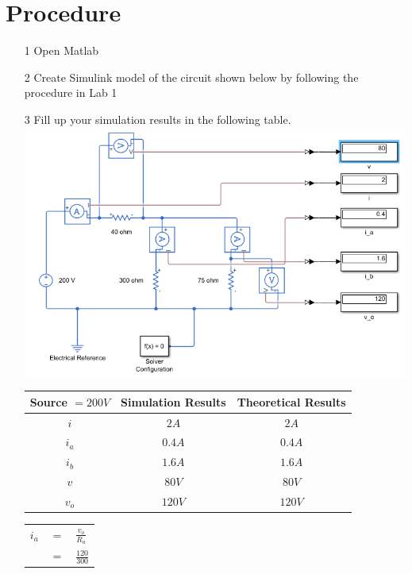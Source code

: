 \documentclass[a4paper]{article}
\begin{document}
\section*{Procedure}
\begin{itemize}
	\item[1] Open Matlab
	\item[2] Create Simulink model of the circuit shown below by following the procedure in Lab 1
	\item[3] Fill up your simulation results in the following table. \\
	      \includegraphics[scale=0.5]{circuit-1+200.png} \\
	      \begin{tabular}{|c|c|c|}
	      	\hline
	      	Source $= 200 V$ & Simulation Results & Theoretical Results \\
	      	\hline
	      	$i$              & $2A$               & $2A$                \\
	      	\hline
	      	$i_{a}$          & $0.4A$             & $0.4A$              \\
	      	\hline
	      	$i_{b}$          & $1.6A$             & $1.6A$              \\
	      	\hline
	      	$v$              & $80V$              & $80V$               \\
	      	\hline
	      	$v_{o}$          & $120V$             & $120V$              \\
	      	\hline
	      \end{tabular} 
	      \begin{tabular}{rcl}
	      	$i_{a}$  & $=$ & $\frac{v_{o}}{R_{a}}$  \\
	      	  & $=$ &  $\frac{120}{300}$ \\

\end{tabular}
\end{itemize}
\end{document}
